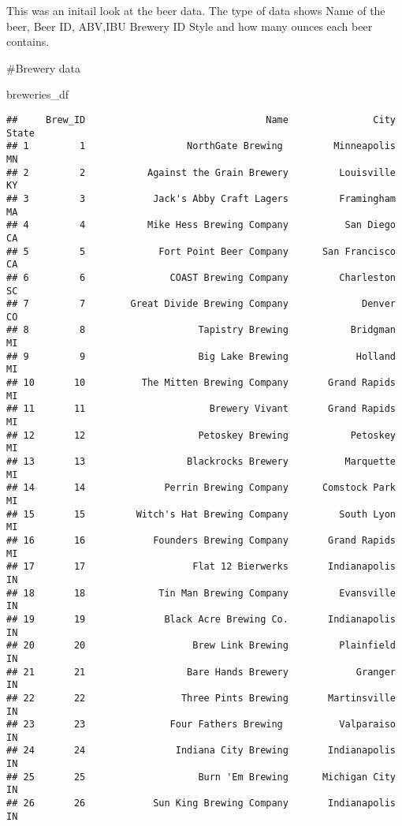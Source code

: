 \documentclass[
]{article}
\newenvironment{Shaded}{\begin{snugshade}}{\end{snugshade}}
\newcommand{\NormalTok}[1]{#1}
\begin{document}
This was an initail look at the beer data. The type of data shows Name
of the beer, Beer ID, ABV,IBU Brewery ID Style and how many ounces each
beer contains.

\#Brewery data

\begin{Shaded}
\begin{Highlighting}[]
\NormalTok{breweries_df}
\end{Highlighting}
\end{Shaded}

\begin{verbatim}
##     Brew_ID                                Name               City State
## 1         1                  NorthGate Brewing         Minneapolis    MN
## 2         2           Against the Grain Brewery         Louisville    KY
## 3         3            Jack's Abby Craft Lagers         Framingham    MA
## 4         4           Mike Hess Brewing Company          San Diego    CA
## 5         5             Fort Point Beer Company      San Francisco    CA
## 6         6               COAST Brewing Company         Charleston    SC
## 7         7        Great Divide Brewing Company             Denver    CO
## 8         8                    Tapistry Brewing           Bridgman    MI
## 9         9                    Big Lake Brewing            Holland    MI
## 10       10          The Mitten Brewing Company       Grand Rapids    MI
## 11       11                      Brewery Vivant       Grand Rapids    MI
## 12       12                    Petoskey Brewing           Petoskey    MI
## 13       13                  Blackrocks Brewery          Marquette    MI
## 14       14              Perrin Brewing Company      Comstock Park    MI
## 15       15         Witch's Hat Brewing Company         South Lyon    MI
## 16       16            Founders Brewing Company       Grand Rapids    MI
## 17       17                   Flat 12 Bierwerks       Indianapolis    IN
## 18       18             Tin Man Brewing Company         Evansville    IN
## 19       19              Black Acre Brewing Co.       Indianapolis    IN
## 20       20                   Brew Link Brewing         Plainfield    IN
## 21       21                  Bare Hands Brewery            Granger    IN
## 22       22                 Three Pints Brewing       Martinsville    IN
## 23       23               Four Fathers Brewing          Valparaiso    IN
## 24       24                Indiana City Brewing       Indianapolis    IN
## 25       25                    Burn 'Em Brewing      Michigan City    IN
## 26       26            Sun King Brewing Company       Indianapolis    IN

\end{verbatim}
\end{document}
